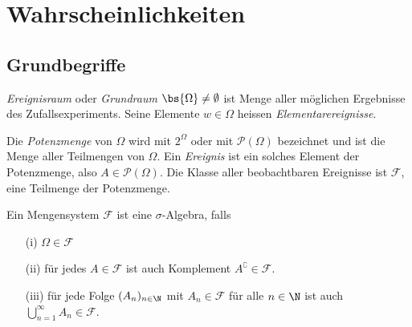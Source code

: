 \setcounter{section}{0} %

\section{Wahrscheinlichkeiten}

\subsection{Grundbegriffe}
\begin{definition}
\textit{Ereignisraum} oder \textit{Grundraum} $\bs{\Omega} \neq \emptyset$ ist Menge aller möglichen Ergebnisse des Zufallsexperiments. Seine Elemente $w\in \Omega$ heissen \textit{Elementarereignisse}.
\end{definition} 

\begin{definition}
Die \textit{Potenzmenge} von $\Omega$ wird mit $2^\Omega$ oder mit $\mathcal{P}(\Omega)$ bezeichnet und ist die Menge aller Teilmengen von $\Omega$. Ein \textit{Ereignis} ist ein solches Element der Potenzmenge, also $A\in\mathcal{P}(\Omega)$. Die Klasse aller beobachtbaren Ereignisse ist $\mathcal{F}$, eine Teilmenge der Potenzmenge.
\end{definition}

\begin{definition}
Ein Mengensystem $\mathcal{F}$ ist eine $\sigma$-Algebra, falls
\begin{itemize}
\item[(i)] $\Omega \in \mathcal{F}$
\item[(ii)] für jedes $A\in\mathcal{F}$ ist auch Komplement $A^\complement \in \mathcal{F}$. 
\item[(iii)] für jede Folge $(A_n)_{n\in\N}$ mit $A_n \in \mathcal{F}$ für alle $n\in \N$ ist auch $\bigcup_{n=1}^\infty A_n \in \mathcal{F}$.
\end{itemize}
\end{definition}

